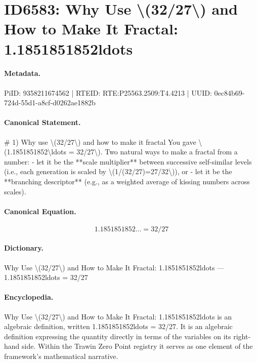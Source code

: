 \section*{ID6583: Why Use \textbackslash{}(32/27\textbackslash{}) and How to Make It Fractal: 1.1851851852ldots}
\paragraph{Metadata.}
PiID: 9358211674562 | RTEID: RTE:P25563.2509:T4.4213 | UUID: 0ec84b69-724d-55d1-a8cf-d0262ae1882b

\paragraph{Canonical Statement.}
\# 1) Why use \textbackslash{}(32/27\textbackslash{}) and how to make it fractal You gave \textbackslash{}(1.1851851852\textbackslash{}ldots = 32/27\textbackslash{}). Two natural ways to make a fractal from a number: - let it be the **scale multiplier** between successive self-similar levels (i.e., each generation is scaled by \textbackslash{}(1/(32/27)=27/32\textbackslash{})), or - let it be the **branching descriptor** (e.g., as a weighted average of kissing numbers across scales).

\paragraph{Canonical Equation.}
\[
1.1851851852\ldots = 32/27
\]

\paragraph{Dictionary.}
Why Use \textbackslash{}(32/27\textbackslash{}) and How to Make It Fractal: 1.1851851852ldots — 1.1851851852ldots = 32/27

\paragraph{Encyclopedia.}
Why Use \textbackslash{}(32/27\textbackslash{}) and How to Make It Fractal: 1.1851851852ldots is an algebraic definition, written 1.1851851852ldots = 32/27. It is an algebraic definition expressing the quantity directly in terms of the variables on its right-hand side. Within the Trawin Zero Point registry it serves as one element of the framework's mathematical narrative.
